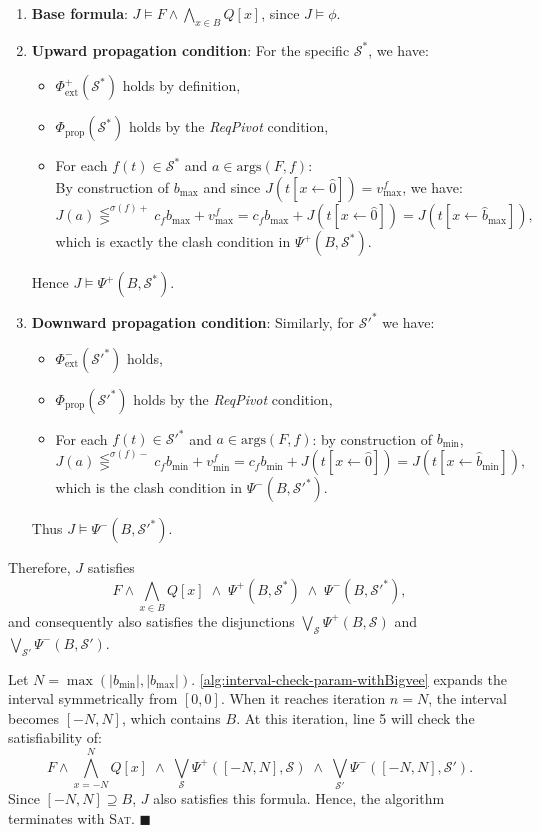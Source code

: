 \documentclass[runningheads]{llncs}
\newcommand{\qedhere}{$\blacksquare$}
\newcommand{\cmpsign}[1]{\lesseqgtr^{#1}}
\newcommand{\coeffsign}[1]{\sigma(#1)}
\newcommand{\args}{\text{args}}
\newcommand{\req}{\emph{ReqPivot}\xspace}
\newcommand{\subst}[3]{#1[#2\leftarrow #3]}
\newcommand{\repr}[1]{\hat{#1}}
\begin{document}
\begin{enumerate}
    \item \textbf{Base formula}: $J \models F \land \bigwedge_{x \in B} Q[x]$, since $J \models \phi$.
    
    \item \textbf{Upward propagation condition}: 
    For the specific $\mathcal{S}^*$, we have:
    \begin{itemize}
        \item $\Phi_{\text{ext}}^+(\mathcal{S}^*)$ holds by definition,
        \item $\Phi_{\text{prop}}(\mathcal{S}^*)$ holds by the \req condition,
        \item For each $f(t)\in\mathcal{S}^*$ and $a \in \args(F,f)$:\\ By construction of $b_{\max}$ and since $J(\subst{t}{x}{\repr{0}})=v_{\max}^f$, we have:   %
        \[
        J(a) \cmpsign{\coeffsign{f}+} c_f b_{\max} + v_{\max}^f = c_f  b_{\max} + J(\subst{t}{x}{\repr{0}}) = J(\subst{t}{x}{\hat{b}_{\max}}),
        \]
        which is exactly the clash condition in $\Psi^+(B,\mathcal{S}^*)$.
    \end{itemize}
    Hence $J \models \Psi^+(B,\mathcal{S}^*)$.
    
    \item \textbf{Downward propagation condition}: 
    Similarly, for $\mathcal{S}'^*$ we have:
    \begin{itemize}
        \item $\Phi_{\text{ext}}^-(\mathcal{S}'^*)$ holds,
        \item $\Phi_{\text{prop}}(\mathcal{S}'^*)$ holds by the \req condition,
        \item For each $f(t)\in\mathcal{S}'^{*}$ and $a \in \args(F,f)$:
        by construction of $b_{\min}$,
        \[
        J(a)\cmpsign{\coeffsign{f}-}  c_f b_{\min} + v_{\min}^f = c_f b_{\min} + J(\subst{t}{x}{\repr{0}}) = J(\subst{t}{x}{\repr{b}_{\min}}),
        \]
        which is the clash condition in $\Psi^-(B,\mathcal{S}'^*)$.       
    \end{itemize}
    Thus $J \models \Psi^-(B,\mathcal{S}'^*)$.
\end{enumerate}

Therefore, $J$ satisfies
\[
F \land \bigwedge_{x \in B} Q[x] \;\land\; \Psi^+(B,\mathcal{S}^*) \;\land\; \Psi^-(B,\mathcal{S}'^*),
\]
and consequently also satisfies the disjunctions $\bigvee_{\mathcal{S}}\Psi^+(B,\mathcal{S})$ and $\bigvee_{\mathcal{S}'}\Psi^-(B,\mathcal{S}')$.

Let $N = \max(|b_{\min}|, |b_{\max}|)$. \cref{alg:interval-check-param-withBigvee} expands the interval symmetrically from $[0,0]$. When it reaches iteration $n = N$, the interval becomes $[-N, N]$, which contains $B$. At this iteration, line 5 will check the satisfiability of:
\[
F \land \bigwedge_{x=-N}^{N} Q[x] \;\land\; \bigvee_{\mathcal{S}}\Psi^+([-N,N],\mathcal{S}) \;\land\; \bigvee_{\mathcal{S}'}\Psi^-([-N,N],\mathcal{S}').
\]
Since $[-N, N]\supseteq B$, $J$ also satisfies this formula. Hence, the algorithm terminates with \textsc{Sat}.
\qedhere
\end{document}
